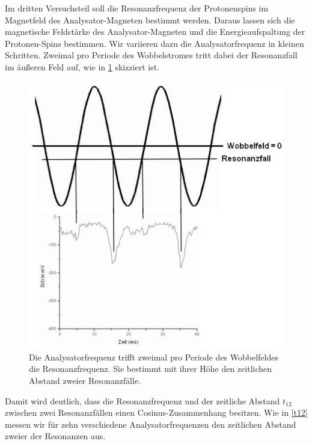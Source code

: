 \documentclass[paper=a4,
	fontsize=10pt,
	DIV=18,
	twocolumn,
	parskip=half
	]{scrartcl}
\numberwithin{equation}{section}    %
\begin{document}
Im dritten Versuchsteil soll die Resonanzfrequenz der Protonenspins im Magnetfeld des Analysator-Magneten bestimmt werden.
Daraus lassen sich die magnetische Feldstärke des Analysator-Magneten und die Energieaufspaltung der Protonen-Spins bestimmen.
Wir variieren dazu die Analysatorfrequenz in kleinen Schritten.
Zweimal pro Periode des Wobbelstromes tritt dabei der Resonanzfall im äußeren Feld auf, wie in \cref{wobbel} skizziert ist.
\begin{figure}[htp]
	\begin{center}
		\includegraphics[width=0.7\columnwidth]{Bilder/Wobbel}
		\caption{Die Analysatorfrequenz trifft zweimal pro Periode des Wobbelfeldes die Resonanzfrequenz. Sie bestimmt mit ihrer Höhe den zeitlichen Abstand zweier Resonanzfälle.}
		\label{wobbel}
	\end{center}
\end{figure}
Damit wird deutlich, dass die Resonanzfrequenz und der zeitliche Abstand $t_{12}$ zwischen zwei Resonanzfällen einen Cosinus-Zusammenhang besitzen.
Wie in \cref{t12} messen wir für zehn verschiedene Analysatorfrequenzen den zeitlichen Abstand zweier der Resonanzen aus.
\end{document}
